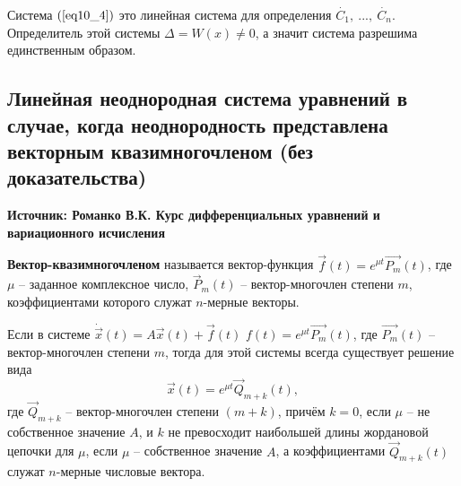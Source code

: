Система $(\ref{eq10_4})$ это линейная система для определения $\dot{C_1}, ~..., ~\dot{C_n}$.
Определитель этой системы $\Delta = W(x) \neq 0$, а значит система разрешима единственным образом.

\subsection{Линейная неоднородная система уравнений в случае, когда неоднородность представлена векторным квазимногочленом (без доказательства)}

\textbf{Источник: Романко В.К. Курс дифференциальных уравнений и вариационного исчисления}

\begin{definition}
    \textbf{Вектор-квазимногочленом} называется вектор-функция $\overrightarrow{f}(t) = e^{\mu t} \overrightarrow{P_m}(t)$, где $\mu$ -- заданное комплексное число, $\overrightarrow{P}_m(t)$ -- вектор-многочлен степени $m$, коэффициентами которого служат $n$-мерные векторы. 
\end{definition}

\begin{theorem}
    Если в системе $\dot{\overrightarrow{x}}(t) = A \overrightarrow{x}(t) + \overrightarrow{f}(t)$ $f(t) = e^{\mu t} \overrightarrow{P_m}(t)$, где $\overrightarrow{P_m}(t)$ -- вектор-многочлен степени $m$, тогда для этой системы всегда существует решение вида
    \[ \overrightarrow{x}(t) = e^{\mu t} \overrightarrow{Q}_{m+k}(t),\]
    где $\overrightarrow{Q}_{m+k}$ -- вектор-многочлен степени $(m + k)$, причём $k = 0$, если $\mu$ -- не собственное значение $A$, и $k$ не превосходит наибольшей длины жордановой цепочки для $\mu$, если $\mu$ -- собственное значение $A$, а коэффициентами $\overrightarrow{Q}_{m+k}(t)$ служат $n$-мерные числовые вектора.
\end{theorem}
